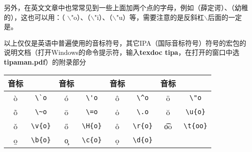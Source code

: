 另外，在英文文章中也常常见到一些上面加两个点的字母，例如（薛定谔）、（幼稚的），这也可以用：（  $\backslash$"o）、（$\backslash$"i）、（$\backslash$"u）等，需要注意的是反斜杠$\backslash$后面的一定是。

以上仅仅是英语中普遍使用的音标符号，其它IPA（国际音标符号）符号的  宏包的说明文档（打开Windows的命令提示符，输入{\bfseries\times  texdoc  tipa}，在打开的窗口中选\textbf{\times  tipaman.pdf}）的附录部分

\begin{table}[H]
\centering
\begin{tabular}{|*{8}{c|}}\hline
音标  &    &音标  &    &音标  &  &音标  &    \\
\hline
\`o  &  \verb|\`o|  &
\'o  &  \verb|\'o|  &
\^o  &  \verb|\^o|  &
\"o  &  \verb|\"o|  \\\hline
\~o  &  \verb|\~o|  &
\=o  &  \verb|\=o|  &
\.o  &  \verb|\.o|  &
\u{o}  &  \verb|\u{o}|  \\\hline
\v{o}  &  \verb|\v{o}|  &
\H{o}  &  \verb|\H{o}|  &
\r{o}  &  \verb|\r{o}|  &
\t{oo}  &  \verb|\t{oo}|  \\\hline
\b{o}  &  \verb|\b{o}|  &
\c{o}  &  \verb|\c{o}|  &
\d{o}  &  \verb|\d{o}|  &
&  \\\hline
\end{tabular}

\end{table}
